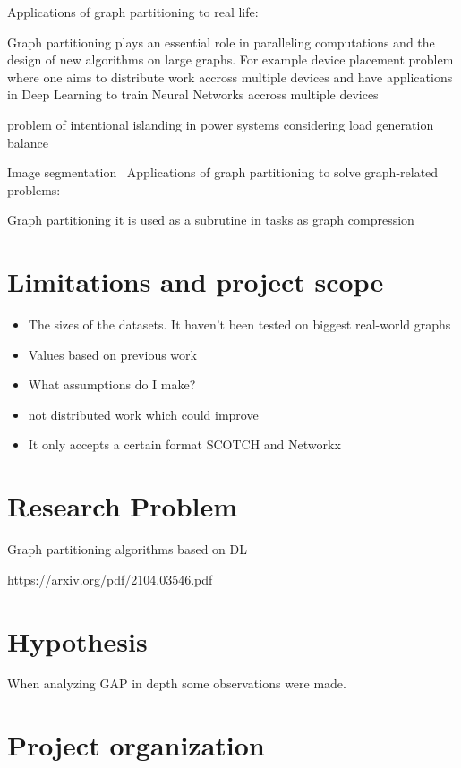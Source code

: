 Applications of graph partitioning to real life:

Graph partitioning plays an essential role in paralleling computations and the design of new algorithms on large graphs. For example device placement problem where one aims to distribute work accross multiple devices and have applications in Deep Learning to train Neural Networks accross multiple devices \cite{deviceplacement} 

problem of intentional islanding in power systems considering load generation balance ~ \cite{islanding}

Image segmentation~\cite{imagesegmentation}
Applications of graph partitioning to solve graph-related problems:

Graph partitioning it is used as a subrutine in tasks as graph compression ~ \cite{compressgraphs}
\section{Limitations and project scope}
\begin{itemize}
    \item The sizes of the datasets. It haven't been tested on biggest real-world graphs
    \item Values based on previous work
    \item What assumptions do I make?
    \item not distributed work which could improve
    \item It only accepts a certain format SCOTCH and Networkx
\end{itemize}

\section{Research Problem}
Graph partitioning algorithms based on DL

https://arxiv.org/pdf/2104.03546.pdf
\section{Hypothesis}
When analyzing GAP in depth some observations were made.

\section{Project organization}

